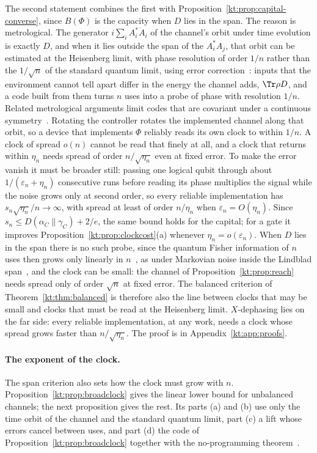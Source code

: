 The second statement combines the first with Proposition~\ref{kt:prop:capital-converse}, since $B(\Phi)$ is the capacity when $D$ lies in the span. The reason is metrological. The generator $i\sum_iA_i^*\dot A_i$ of the channel's orbit under time evolution is exactly $D$, and when it lies outside the span of the $A_i^*A_j$, that orbit can be estimated at the Heisenberg limit, with phase resolution of order $1/n$ rather than the $1/\sqrt n$ of the standard quantum limit, using error correction~\cite{ZhouZhangPreskillJiang18,ZhouJiang21}: inputs that the environment cannot tell apart differ in the energy the channel adds, $\Tr\rho D$, and a code built from them turns $n$ uses into a probe of phase with resolution $1/n$. Related metrological arguments limit codes that are covariant under a continuous symmetry~\cite{KubicaDemkowicz21,ZhouLiuJiang21}. Rotating the controller rotates the implemented channel along that orbit, so a device that implements $\Phi$ reliably reads its own clock to within $1/n$. A clock of spread $o(n)$ cannot be read that finely at all, and a clock that returns within $\eta_n$ needs spread of order $n/\sqrt{\eta_n}$ even at fixed error. To make the error vanish it must be broader still: passing one logical qubit through about $1/(\varepsilon_n+\eta_n)$ consecutive runs before reading its phase multiplies the signal while the noise grows only at second order, so every reliable implementation has $s_n\sqrt{\eta_n}/n\to\infty$, with spread at least of order $n/\eta_n$ when $\varepsilon_n=O(\eta_n)$. Since $s_n\le D(\alpha_C\|\gamma_C)+2/e$, the same bound holds for the capital; for a gate it improves Proposition~\ref{kt:prop:clockcost}(a) whenever $\eta_n=o(\varepsilon_n)$. When $D$ lies in the span there is no such probe, since the quantum Fisher information of $n$ uses then grows only linearly in $n$~\cite{FujiwaraImai08,DKG12,DemkowiczMaccone14,SSKD17,ZhouJiang21}, as under Markovian noise inside the Lindblad span~\cite{DemkowiczCzajkowskiSekatski17}, and the clock can be small: the channel of Proposition~\ref{kt:prop:reach} needs spread only of order $\sqrt n$ at fixed error. The balanced criterion of Theorem~\ref{kt:thm:balanced} is therefore also the line between clocks that may be small and clocks that must be read at the Heisenberg limit. $X$-dephasing lies on the far side: every reliable implementation, at any work, needs a clock whose spread grows faster than $n/\sqrt{\eta_n}$. The proof is in Appendix~\ref{kt:app:proofs}.

\paragraph{The exponent of the clock.} The span criterion also sets how the clock must grow with $n$. Proposition~\ref{kt:prop:broadclock} gives the linear lower bound for unbalanced channels; the next proposition gives the rest. Its parts (a) and (b) use only the time orbit of the channel and the standard quantum limit, part (c) a lift whose errors cancel between uses, and part (d) the code of Proposition~\ref{kt:prop:broadclock} together with the no-programming theorem~\cite{NielsenChuang97,KubickiPalazuelosPerezGarcia19}.

